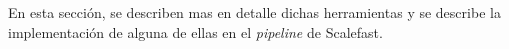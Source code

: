 \documentclass[12pt]{report} %
\begin{document}
En esta sección, se describen mas en detalle dichas herramientas y se describe
la implementación de alguna de ellas en el \textit{\gls{pipeline}} de Scalefast.

\clearpage

\printglossary[type=\acronymtype]

\printglossary




\end{document}
